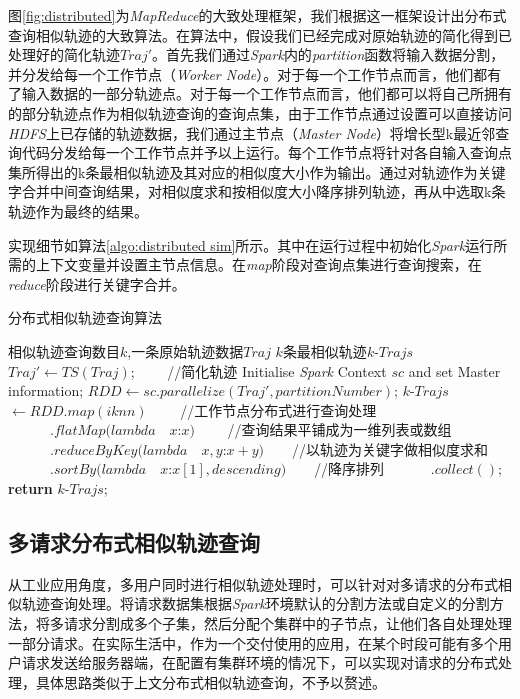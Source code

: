 图\ref{fig:distributed}\cite{dean2008mapreduce}为\emph{MapReduce}的大致处理框架，我们根据这一框架设计出分布式查询相似轨迹的大致算法。在算法中，假设我们已经完成对原始轨迹的简化得到已处理好的简化轨迹$Traj'$\cite{chen2009trajectory}。首先我们通过\emph{Spark}内的\emph{partition}函数将输入数据分割，并分发给每一个工作节点（\emph{Worker Node}）。对于每一个工作节点而言，他们都有了输入数据的一部分轨迹点。对于每一个工作节点而言，他们都可以将自己所拥有的部分轨迹点作为相似轨迹查询的查询点集，由于工作节点通过设置可以直接访问\emph{HDFS}上已存储的轨迹数据，我们通过主节点（\emph{Master Node}）将增长型k最近邻查询代码分发给每一个工作节点并予以上运行。每个工作节点将针对各自输入查询点集所得出的k条最相似轨迹及其对应的相似度大小作为输出。通过对轨迹作为关键字合并中间查询结果，对相似度求和按相似度大小降序排列轨迹，再从中选取k条轨迹作为最终的结果。

实现细节如算法\ref{algo:distributed sim}所示。其中在运行过程中初始化\emph{Spark}运行所需的上下文变量并设置主节点信息。在\emph{map}阶段对查询点集进行查询搜索，在\emph{reduce}阶段进行关键字合并。

\begin{algorithm}
\caption{分布式相似轨迹查询算法}
\label{algo:distributed sim}
\begin{algorithmic}[1] %
\Require 相似轨迹查询数目$k$,一条原始轨迹数据$Traj$%
\Ensure $k$条最相似轨迹$k$-$Trajs$ %
\State $Traj' \gets TS(Traj)$; $\qquad$//简化轨迹
\State Initialise \emph{Spark} Context $sc$ and set Master information;
\State $RDD \gets sc.parallelize(Traj', partitionNumber)$;
\State $k$-$Trajs$ $\gets RDD.map(iknn) $ $\qquad$//工作节点分布式进行查询处理
\State $\qquad\quad.flatMap(lambda\quad x$:$x)$ $\qquad$//查询结果平铺成为一维列表或数组
\State $\qquad\quad.reduceByKey(lambda\quad x,y$:$x+y)$$\qquad$//以轨迹为关键字做相似度求和
\State $\quad\qquad.sortBy(lambda\quad x$:$x[1], descending)$$\qquad$//降序排列
\State $\quad\qquad.collect()$;
\State \textbf{return} $k$-$Trajs$; 
\end{algorithmic}
\end{algorithm}

\subsection{多请求分布式相似轨迹查询}
\label{subsec:distributed multiple}
从工业应用角度，多用户同时进行相似轨迹处理时，可以针对对多请求的分布式相似轨迹查询处理。将请求数据集根据\emph{Spark}环境默认的分割方法或自定义的分割方法，将多请求分割成多个子集，然后分配个集群中的子节点，让他们各自处理处理一部分请求。在实际生活中，作为一个交付使用的应用，在某个时段可能有多个用户请求发送给服务器端，在配置有集群环境的情况下，可以实现对请求的分布式处理，具体思路类似于上文分布式相似轨迹查询，不予以赘述。


